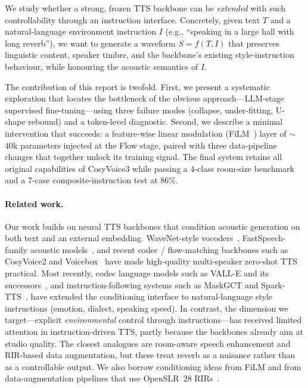 \documentclass{article}
\begin{document}
We study whether a strong, frozen TTS backbone can be \emph{extended} with such
controllability through an instruction interface. Concretely, given text $T$
and a natural-language environment instruction $I$ (e.g., ``speaking in a
large hall with long reverb''), we want to generate a waveform $S = f(T,I)$
that preserves linguistic content, speaker timbre, and the backbone's existing
style-instruction behaviour, while honouring the acoustic semantics of $I$.

The contribution of this report is twofold. First, we present a systematic
exploration that locates the bottleneck of the obvious approach---LLM-stage
supervised fine-tuning---using three failure modes (collapse, under-fitting,
U-shape rebound) and a token-level diagnostic. Second, we describe a minimal
intervention that succeeds: a feature-wise linear modulation
(FiLM~\citep{perez2018film}) layer of $\sim$40k parameters injected at the
Flow stage, paired with three data-pipeline changes that together unlock its
training signal. The final system retains all original capabilities of
CosyVoice3 while passing a 4-class room-size benchmark and a 7-case
composite-instruction test at $86\%$.

\paragraph{Related work.}
Our work builds on neural TTS backbones that condition acoustic generation on
both text and an external embedding. WaveNet-style
vocoders~\citep{shen2018natural,ping2019clarinet}, FastSpeech-family acoustic
models~\citep{ren2019fastspeech,ren2021fastspeech2}, and recent codec /
flow-matching backbones such as CosyVoice2 and Voicebox~\citep{le2023voicebox}
have made high-quality multi-speaker zero-shot TTS practical. Most recently,
codec language models such as VALL-E and its successors~\citep{wang2023neuralcodecLM,
chen2024valle2,han2024valler,song2024ellav,du2024vallt,wang2024maskgct}, and
instruction-following systems such as
MaskGCT and Spark-TTS~\citep{wang2025sparktts}, have extended the conditioning
interface to natural-language style instructions (emotion, dialect, speaking
speed). In contrast, the dimension we target---explicit \emph{environmental}
control through instructions---has received limited attention in
instruction-driven TTS, partly because the backbones already aim at studio
quality. The closest analogues are room-aware speech enhancement and RIR-based
data augmentation, but these treat reverb as a nuisance rather than as a
controllable output. We also borrow conditioning ideas from FiLM
\citep{perez2018film} and from data-augmentation pipelines that use OpenSLR~28
RIRs~\citep{ko2017rir}.
\end{document}
